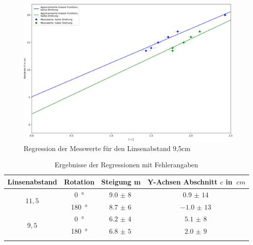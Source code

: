 \begin{figure}[h!]{}
    \begin{center}
        \includegraphics[scale=0.4]{./fig/Abbe_Reg_Messreihe2_Plot.pdf}
        \caption{Regression der Messwerte für den Linsenabstand 9,5cm}
        \label{fig:Abbe-Regress-S1}
    \end{center}
\end{figure}


\begin{table}[h!]
    \begin{center}
        \caption{Ergebnisse der Regressionen mit Fehlerangaben}
        \begin{tabular}{cccc}
            \hline
            Linsenabstand   & Rotation   & Steigung m   & Y-Achsen Abschnitt $c$ in $\SI{}{cm}$\\
            \hline
            
            \multirow{2}{*}{$11,5$}  & \SI{0}{\degree}   & $\SI{9,0(8)}{}$   & $\SI{0,9(14)}{}$ \\
                                    & \SI{180}{\degree} & $\SI{8,7(6)}{}$   & $\SI{-1,0(13)}{}$ \\
            \hline
            \multirow{2}{*}{$9,5$}  & \SI{0}{\degree}   & $\SI{6,2(4)}{}$ & $\SI{5,1(8)}{}$ \\
                                    & \SI{180}{\degree} & $\SI{6,8(5)}{}$  & $\SI{2,0(9)}{}$ \\
            \hline
            \label{tab:abbe-Regression-S1}
        \end{tabular}
    \end{center}
\end{table}

